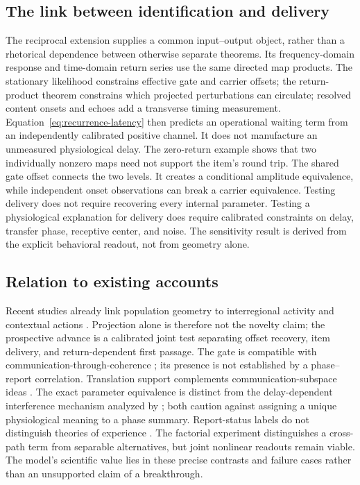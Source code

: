 \documentclass[submission,nolinenumbers]{esj}
\begin{document}
\subsection{The link between identification and delivery}
The reciprocal extension supplies a common input--output object, rather than a rhetorical dependence between otherwise separate theorems. Its frequency-domain response and time-domain return series use the same directed map products. The stationary likelihood constrains effective gate and carrier offsets; the return-product theorem constrains which projected perturbations can circulate; resolved content onsets and echoes add a transverse timing measurement. Equation~\eqref{eq:recurrence-latency} then predicts an operational waiting term from an independently calibrated positive channel. It does not manufacture an unmeasured physiological delay. The zero-return example shows that two individually nonzero maps need not support the item's round trip.
The shared gate offset connects the two levels. It creates a conditional amplitude equivalence, while independent onset observations can break a carrier equivalence. Testing delivery does not require recovering every internal parameter. Testing a physiological explanation for delivery does require calibrated constraints on delay, transfer phase, receptive center, and noise. The sensitivity result is derived from the explicit behavioral readout, not from geometry alone.



\subsection{Relation to existing accounts}
Recent studies already link population geometry to interregional activity and contextual actions \citep{macdowell2025,gonzalez2026,binish2026}. Projection alone is therefore not the novelty claim; the prospective advance is a calibrated joint test separating offset recovery, item delivery, and return-dependent first passage. The gate is compatible with communication-through-coherence \citep{fries2015}; its presence is not established by a phase--report correlation. Translation support complements communication-subspace ideas \citep{semedo2019}. The exact parameter equivalence is distinct from the delay-dependent interference mechanism analyzed by \citet{dowdall2023}; both caution against assigning a unique physiological meaning to a phase summary. Report-status labels do not distinguish theories of experience \citep{dehaene2006,lamme2006}. The factorial experiment distinguishes a cross-path term from separable alternatives, but joint nonlinear readouts remain viable. The model's scientific value lies in these precise contrasts and failure cases rather than an unsupported claim of a breakthrough.
\end{document}
